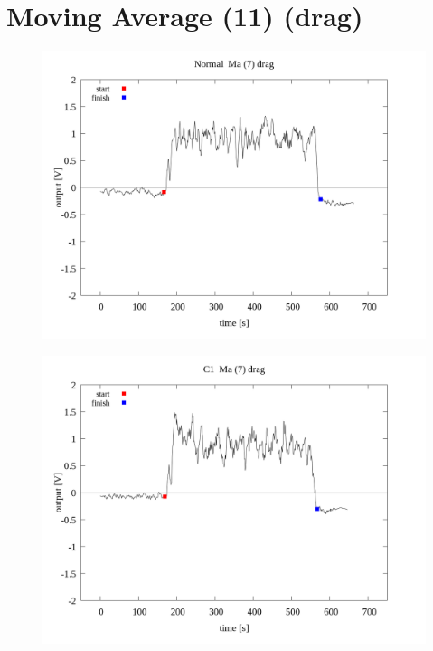 \documentclass[a4paper]{jsarticle}
\author{}
\title{}
\date{}
\begin{document}
\section{Moving Average (11) (drag)}

\begin{figure}[htbp]
    \footnotesize
    \begin{center}
        \includegraphics[width=140mm]{../../../../33_result/210806/moving_average/7/drag/02/Normal_ma(7)_drag_02.png}
    \end{center}
\end{figure}

\begin{figure}[htbp]
    \footnotesize
    \begin{center}
        \includegraphics[width=140mm]{../../../../33_result/210806/moving_average/7/drag/02/C1_ma(7)_drag_02.png}
    \end{center}
\end{figure}
\end{document}
